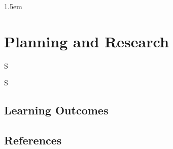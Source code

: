 \frenchspacing
{1.5em}
\chapter{Planning and Research}
\epigraph{S}{S}

%
\section{Learning Outcomes}

%
\section{References}
